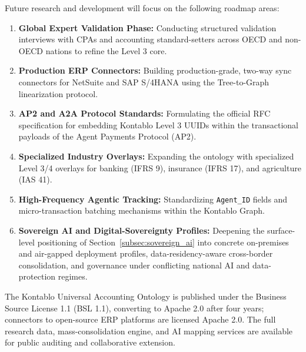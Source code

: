 Future research and development will focus on the following roadmap areas:
\begin{enumerate}
    \item \textbf{Global Expert Validation Phase:} Conducting structured validation interviews with CPAs and accounting standard-setters across OECD and non-OECD nations to refine the Level 3 core.
    \item \textbf{Production ERP Connectors:} Building production-grade, two-way sync connectors for NetSuite and SAP S/4HANA using the Tree-to-Graph linearization protocol.
    \item \textbf{AP2 and A2A Protocol Standards:} Formulating the official RFC specification for embedding Kontablo Level 3 UUIDs within the transactional payloads of the Agent Payments Protocol (AP2).
    \item \textbf{Specialized Industry Overlays:} Expanding the ontology with specialized Level 3/4 overlays for banking (IFRS 9), insurance (IFRS 17), and agriculture (IAS 41).
    \item \textbf{High-Frequency Agentic Tracking:} Standardizing \texttt{Agent\_ID} fields and micro-transaction batching mechanisms within the Kontablo Graph.
    \item \textbf{Sovereign AI and Digital-Sovereignty Profiles:} Deepening the surface-level positioning of Section~\ref{subsec:sovereign_ai} into concrete on-premises and air-gapped deployment profiles, data-residency-aware cross-border consolidation, and governance under conflicting national AI and data-protection regimes.
\end{enumerate}

The Kontablo Universal Accounting Ontology is published under the Business Source License 1.1 (BSL 1.1), converting to Apache 2.0 after four years; connectors to open-source ERP platforms are licensed Apache 2.0. The full research data, mass-consolidation engine, and AI mapping services are available for public auditing and collaborative extension.

